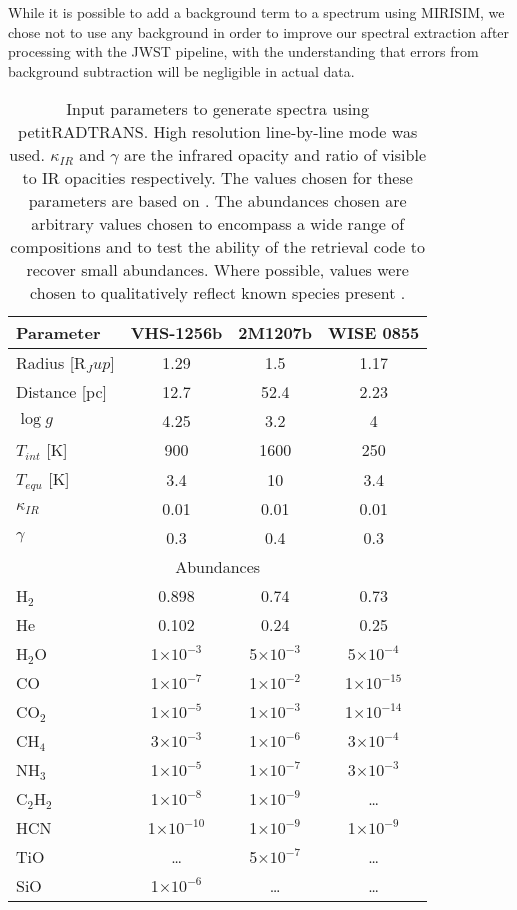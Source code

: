 While it is possible to add a background term to a spectrum using MIRISIM, we chose not to use any background in order to improve our spectral extraction after processing with the JWST pipeline, with the understanding that errors from background subtraction will be negligible in actual data.
\begin{table}[t]
	\centering
	\begin{tabular}{l|ccc}
		\toprule
		\textbf{Parameter} & \textbf{VHS-1256b} & \textbf{2M1207b} & \textbf{WISE 0855}\\
		\midrule
		Radius [R$_Jup$] & 1.29 & 1.5 & 1.17\\
		Distance [pc] & 12.7 & 52.4 & 2.23\\
		$\log g$ & 4.25 & 3.2 & 4\\
		$T_{int}$ [K]& 900 & 1600 & 250\\
		$T_{equ}$ [K]& 3.4 & 10 & 3.4\\
		$\kappa_{IR}$ & 0.01 & 0.01 & 0.01\\
		$\gamma$ & 0.3 & 0.4 & 0.3\\
		\midrule
		\multicolumn{4}{c}{Abundances}\\
		\midrule
		 H$_{2}$ & 0.898 & 0.74 & 0.73\\
		 He & 0.102 & 0.24 & 0.25\\
		 H$_{2}$O & 1$\times10^{-3}$ & 5$\times10^{-3}$ & 5$\times10^{-4}$\\
		 CO & 1$\times10^{-7}$& 1$\times10^{-2}$ & 1$\times10^{-15}$\\
		 CO$_{2}$ & 1$\times10^{-5}$& 1$\times10^{-3}$ & 1$\times10^{-14}$\\
		 CH$_{4}$ & 3$\times10^{-3}$& 1$\times10^{-6}$ & 3$\times10^{-4}$\\
		 NH$_{3}$ & 1$\times10^{-5}$& 1$\times10^{-7}$ & 3$\times10^{-3}$\\
		 C$_{2}$H$_{2}$ & 1$\times10^{-8}$& 1$\times10^{-9}$& \ldots \\
		 HCN & 1$\times10^{-10}$ & 1$\times10^{-9}$ & 1$\times10^{-9}$ \\
		 TiO & \ldots & 5$\times10^{-7}$ & \ldots \\
		 SiO & 1$\times10^{-6}$ &  \ldots & \ldots \\
		\bottomrule
	\end{tabular}
	\caption[petitRADTRANS inputs.]{Input parameters to generate spectra using petitRADTRANS. High resolution line-by-line mode was used. $\kappa_{IR}$ and $\gamma$ are the infrared opacity and ratio of visible to IR opacities respectively. The values chosen for these parameters are based on \parencite{Molliere2019}. The abundances chosen are arbitrary values chosen to encompass a wide range of compositions and to test the ability of the retrieval code to recover small abundances. Where possible, values were chosen to qualitatively reflect known species present \parencite{Miles2018}. }
	\label{tab:inputparams}
\end{table}
